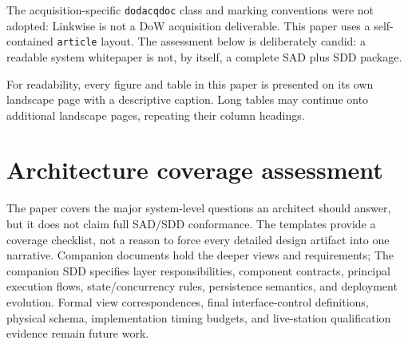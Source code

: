 \documentclass[11pt,a4paper]{article}
\begin{document}
The acquisition-specific \texttt{dodacqdoc} class and marking conventions were not adopted: Linkwise is not a DoW acquisition deliverable. This paper uses a self-contained \texttt{article} layout. The assessment below is deliberately candid: a readable system whitepaper is not, by itself, a complete SAD plus SDD package.

For readability, every figure and table in this paper is presented on its own
landscape page with a descriptive caption. Long tables may continue onto
additional landscape pages, repeating their column headings.

\section{Architecture coverage assessment}\label{app:template-alignment}
The paper covers the major system-level questions an architect should answer,
but it does not claim full SAD/SDD conformance. The templates provide a
coverage checklist, not a reason to force every detailed design artifact into
one narrative. Companion documents hold the deeper views and requirements;
The companion SDD specifies layer responsibilities, component contracts,
principal execution flows, state/concurrency rules, persistence semantics,
and deployment evolution. Formal view correspondences, final
interface-control definitions, physical schema, implementation timing
budgets, and live-station qualification evidence remain future work.
\end{document}
